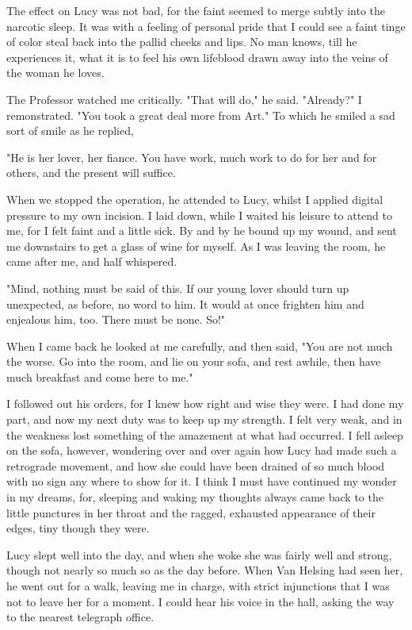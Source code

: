 The effect on Lucy was not bad, for the faint seemed to merge subtly into the narcotic sleep. It was with a feeling of personal pride that I could see a faint tinge of color steal back into the pallid cheeks and lips. No man knows, till he experiences it, what it is to feel his own lifeblood drawn away into the veins of the woman he loves. 

The Professor watched me critically. "That will do," he said. "Already?" I remonstrated. "You took a great deal more from Art." To which he smiled a sad sort of smile as he replied, 

"He is her lover, her fiance. You have work, much work to do for her and for others, and the present will suffice. 

When we stopped the operation, he attended to Lucy, whilst I applied digital pressure to my own incision. I laid down, while I waited his leisure to attend to me, for I felt faint and a little sick. By and by he bound up my wound, and sent me downstairs to get a glass of wine for myself. As I was leaving the room, he came after me, and half whispered. 

"Mind, nothing must be said of this. If our young lover should turn up unexpected, as before, no word to him. It would at once frighten him and enjealous him, too. There must be none. So!" 

When I came back he looked at me carefully, and then said, "You are not much the worse. Go into the room, and lie on your sofa, and rest awhile, then have much breakfast and come here to me." 

I followed out his orders, for I knew how right and wise they were. I had done my part, and now my next duty was to keep up my strength. I felt very weak, and in the weakness lost something of the amazement at what had occurred. I fell asleep on the sofa, however, wondering over and over again how Lucy had made such a retrograde movement, and how she could have been drained of so much blood with no sign any where to show for it. I think I must have continued my wonder in my dreams, for, sleeping and waking my thoughts always came back to the little punctures in her throat and the ragged, exhausted appearance of their edges, tiny though they were. 

Lucy slept well into the day, and when she woke she was fairly well and strong, though not nearly so much so as the day before. When Van Helsing had seen her, he went out for a walk, leaving me in charge, with strict injunctions that I was not to leave her for a moment. I could hear his voice in the hall, asking the way to the nearest telegraph office. 

